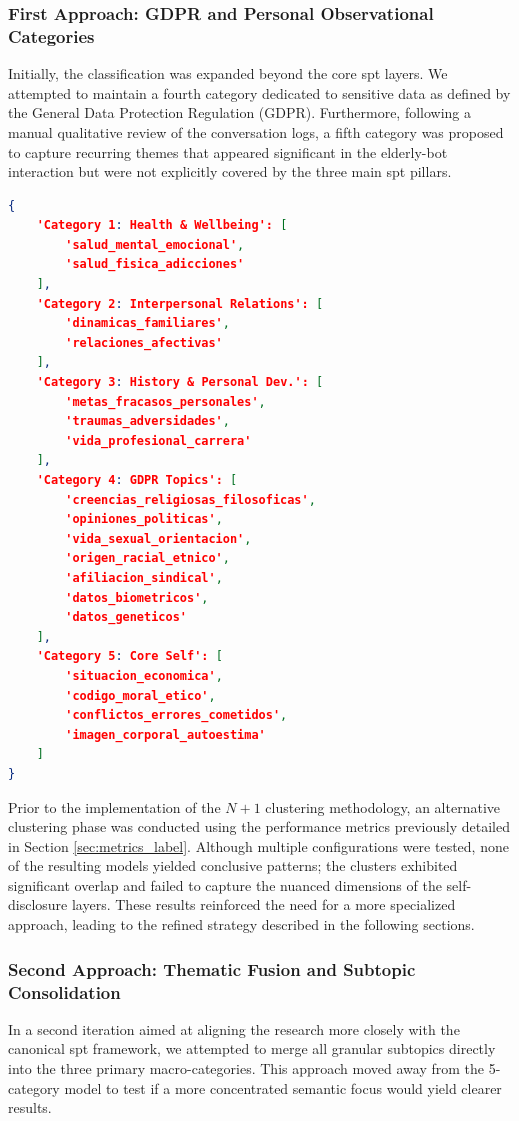 \subsubsection{First Approach: GDPR and Personal Observational Categories}
Initially, the classification was expanded beyond the core spt layers. We attempted to maintain a fourth category dedicated to sensitive data as defined by the General Data Protection Regulation (GDPR). Furthermore, following a manual qualitative review of the conversation logs, a fifth category was proposed to capture recurring themes that appeared significant in the elderly-bot interaction but were not explicitly covered by the three main spt pillars.

\begin{lstlisting}[language=json, caption={Initial 5-Category Experimental Schema.}, label={lst:initial_categories}]
{
    'Category 1: Health & Wellbeing': [
        'salud_mental_emocional', 
        'salud_fisica_adicciones'
    ],
    'Category 2: Interpersonal Relations': [
        'dinamicas_familiares', 
        'relaciones_afectivas'
    ],
    'Category 3: History & Personal Dev.': [
        'metas_fracasos_personales', 
        'traumas_adversidades', 
        'vida_profesional_carrera'
    ],
    'Category 4: GDPR Topics': [
        'creencias_religiosas_filosoficas', 
        'opiniones_politicas', 
        'vida_sexual_orientacion', 
        'origen_racial_etnico', 
        'afiliacion_sindical', 
        'datos_biometricos', 
        'datos_geneticos'
    ],
    'Category 5: Core Self': [
        'situacion_economica', 
        'codigo_moral_etico', 
        'conflictos_errores_cometidos', 
        'imagen_corporal_autoestima'
    ]
}
\end{lstlisting}

Prior to the implementation of the $N+1$ clustering methodology, an alternative clustering phase was conducted using the performance metrics previously detailed in Section \ref{sec:metrics_label}. Although multiple configurations were tested, none of the resulting models yielded conclusive patterns; the clusters exhibited significant overlap and failed to capture the nuanced dimensions of the self-disclosure layers. These results reinforced the need for a more specialized approach, leading to the refined strategy described in the following sections.


\subsubsection{Second Approach: Thematic Fusion and Subtopic Consolidation}
In a second iteration aimed at aligning the research more closely with the canonical spt framework, we attempted to merge all granular subtopics directly into the three primary macro-categories. This approach moved away from the 5-category model to test if a more concentrated semantic focus would yield clearer results.

